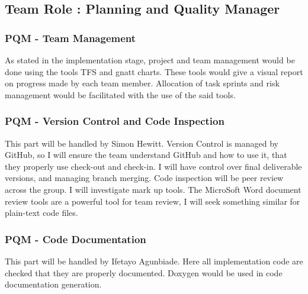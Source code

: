 \documentclass{article}
\begin{document}
\begin{comment}
Software testing is a combinatorial problem. For example, every boolean decision statement requires at least two tests: one with an outcome of "true" and one with an outcome of "false". As a result, for every line of code written, programmers often need 3 to 5 lines of test code.\cite{myers2011art} This obviously takes time and its investment may not be worth the effort. There are also many problems that cannot easily be tested at all – for example those that are nondeterministic or involve multiple threads. In addition, code for a unit test is likely to be at least as buggy as the code it is testing. 
\end{comment}



\newpage
\subsection{Team Role : Planning and Quality Manager}

\subsubsection{PQM - Team Management}
As stated in the implementation stage, project and team management would be done using the tools TFS and gnatt charts. These tools would give a visual report on progress made by each team member. Allocation of task sprints and risk management would be facilitated with the use of the said tools.
\subsubsection{PQM - Version Control and Code Inspection}
This part will be handled by Simon Hewitt. Version Control is managed by GitHub, so I will ensure the team understand GitHub and how to use it, that they properly use check-out and check-in. I will have control over final deliverable versions, and managing branch merging.
Code inspection will be peer review across the group. I will investigate mark up tools. The MicroSoft Word document review tools are a powerful tool for team review, I will seek something similar for plain-text code files. 
\subsubsection{PQM - Code Documentation}
This part will be handled by Ifetayo Agunbiade. Here all implementation code are checked that they are properly documented. Doxygen would be used in code documentation generation.
\end{document}
